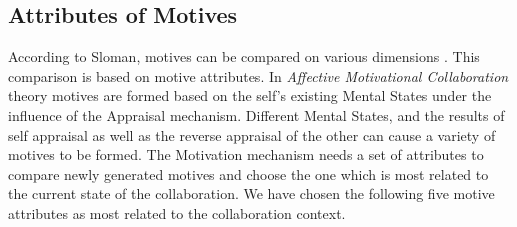 \documentclass[12pt]{report}
\begin{document}
\subsection{Attributes of Motives}
\label{section-motive-attributes}

According to Sloman, motives can be compared on various dimensions
\cite{sloman:motivation}. This comparison is based on motive attributes. In
\textit{Affective Motivational Collaboration} theory motives are formed based
on the self's existing Mental States under the influence of the Appraisal
mechanism. Different Mental States, and the results of self appraisal as well as
the reverse appraisal of the other can cause a variety of motives to be formed.
The Motivation mechanism needs a set of attributes to compare newly generated
motives and choose the one which is most related to the current state of the
collaboration. We have chosen the following five motive attributes as most
related to the collaboration context.
\end{document}
